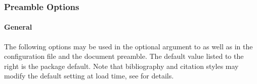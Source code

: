 \documentclass{ltxdockit}[2011/03/25]
\begin{document}
\subsubsection{Preamble Options}
\label{use:opt:pre}

\paragraph{General}
\label{use:opt:pre:gen}

The following options may be used in the optional argument to  as well as in the configuration file and the document preamble. The default value listed to the right is the package default. Note that bibliography and citation styles may modify the default setting at load time, see  for details.
\end{document}
